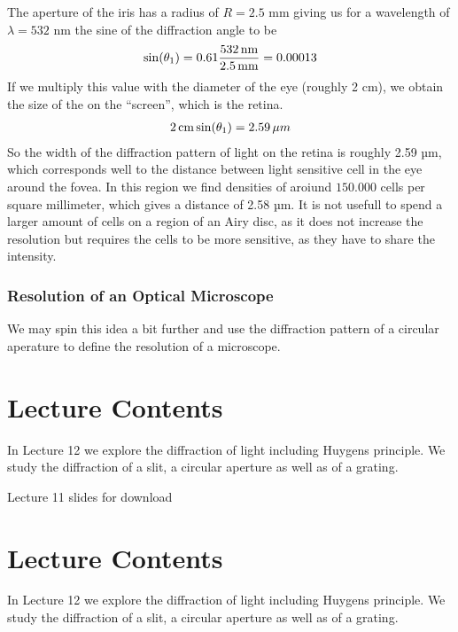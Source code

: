 \documentclass[letterpaper,10pt,english]{sphinxmanual}
\let\sphinxpxdimen\pdfpxdimen\else\newdimen\sphinxpxdimen
\begin{document}
The aperture of the iris has a radius of \(R=2.5\) mm giving us for a wavelength of \(\lambda=532\) nm the sine of the diffraction angle to be
\begin{equation*}
\begin{split}\sin(\theta_1)=0.61\frac{532\, {\rm nm}}{2.5\, {\rm mm}}=0.00013\end{split}
\end{equation*}
If we multiply this value with the diameter of the eye (roughly 2 cm), we obtain the size of the  on the “screen”, which is the retina.
\begin{equation*}
\begin{split}2\,{\rm cm}\sin(\theta_1)=2.59\, {\mu m}\end{split}
\end{equation*}
So the width of the diffraction pattern of light on the retina is roughly 2.59 µm, which corresponds well to the distance between light sensitive cell in the eye around the fovea. In this region we find densities of aroiund \(150.000\) cells per square millimeter, which gives a distance of 2.58 µm. It is not usefull to spend a larger amount of cells on a region of an Airy disc, as it does not increase the resolution but requires the cells to be more sensitive, as they have to share the
intensity.


\subsubsection{Resolution of an Optical Microscope}
\label{\detokenize{notebooks/L12/Diffraction:Resolution-of-an-Optical-Microscope}}
We may spin this idea a bit further and use the diffraction pattern of a circular aperature to define the resolution of a microscope.


\section{Lecture Contents}
\label{\detokenize{lectures/L13/overview_13:lecture-contents}}\label{\detokenize{lectures/L13/overview_13::doc}}
In Lecture 12 we explore the diffraction of light including Huygens principle. We study the diffraction of a slit, a circular aperture as well as of a grating.

\noindent\sphinxincludegraphics[width=600\sphinxpxdimen]{{slides4}.png}

Lecture 11 slides for download 


\section{Lecture Contents}
\label{\detokenize{lectures/L14/overview_14:lecture-contents}}\label{\detokenize{lectures/L14/overview_14::doc}}
In Lecture 12 we explore the diffraction of light including Huygens principle. We study the diffraction of a slit, a circular aperture as well as of a grating.
\end{document}
